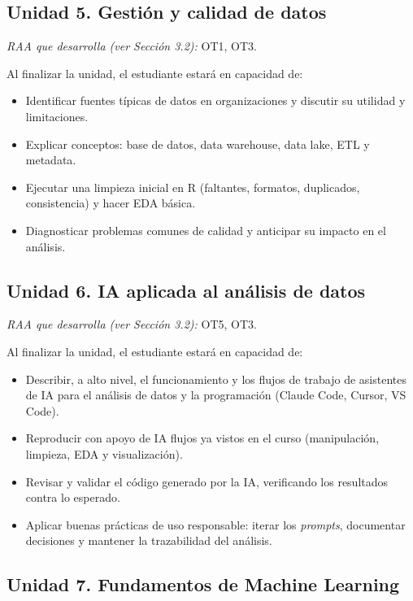 \documentclass[11pt,a4paper]{article}
\begin{document}
\subsection*{Unidad 5. Gestión y calidad de datos}

\textit{RAA que desarrolla (ver Sección 3.2):} OT1, OT3.

Al finalizar la unidad, el estudiante estará en capacidad de:

\begin{itemize}
    \item Identificar fuentes típicas de datos en organizaciones y discutir su utilidad y limitaciones.
    \item Explicar conceptos: base de datos, data warehouse, data lake, ETL y metadata.
    \item Ejecutar una limpieza inicial en R (faltantes, formatos, duplicados, consistencia) y hacer EDA básica.
    \item Diagnosticar problemas comunes de calidad y anticipar su impacto en el análisis.
\end{itemize}

\subsection*{Unidad 6. IA aplicada al análisis de datos}

\textit{RAA que desarrolla (ver Sección 3.2):} OT5, OT3.

Al finalizar la unidad, el estudiante estará en capacidad de:

\begin{itemize}
    \item Describir, a alto nivel, el funcionamiento y los flujos de trabajo de asistentes de IA para el análisis de datos y la programación (Claude Code, Cursor, VS Code).
    \item Reproducir con apoyo de IA flujos ya vistos en el curso (manipulación, limpieza, EDA y visualización).
    \item Revisar y validar el código generado por la IA, verificando los resultados contra lo esperado.
    \item Aplicar buenas prácticas de uso responsable: iterar los \textit{prompts}, documentar decisiones y mantener la trazabilidad del análisis.
\end{itemize}

\subsection*{Unidad 7. Fundamentos de Machine Learning}
\end{document}
